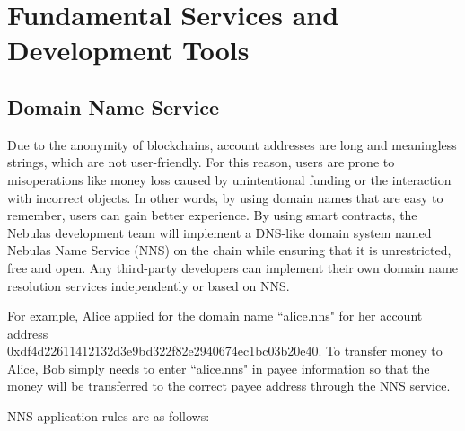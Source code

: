 \section{Fundamental Services and Development Tools}
\label{sec:tools}

\subsection{Domain Name Service}

Due to the anonymity of blockchains, account addresses are long and meaningless strings, which are not user-friendly. For this reason, users are prone to misoperations like money loss caused by unintentional funding or the interaction with incorrect objects. In other words, by using domain names that are easy to remember, users can gain better experience. By using smart contracts, the Nebulas development team will implement a DNS-like domain system named Nebulas Name Service (NNS) on the chain while ensuring that it is unrestricted, free and open. Any third-party developers can implement their own domain name resolution services independently or based on NNS.

For example, Alice applied for the domain name ``alice.nns" for her account address \\0xdf4d22611412132d3e9bd322f82e2940674ec1bc03b20e40. To transfer money to Alice, Bob simply needs to enter ``alice.nns" in payee information so that the money will be transferred to the correct payee address through the NNS service.


NNS application rules are as follows:

